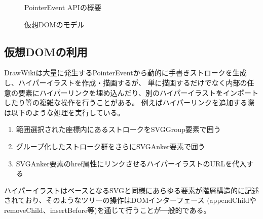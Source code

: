 \begin{figure}[htbp] \begin{minipage}{0.5\hsize}
                         \begin{center}
                              \end{center}
                         \caption{PointerEvent APIの概要} \label{pevent}
\end{minipage} \begin{minipage}{0.5\hsize}
                            \begin{center}
                                 \end{center}
                            \caption{仮想DOMのモデル} \label{vdom}
\end{minipage}
\end{figure}

\subsection{仮想DOMの利用}
DrawWikiは大量に発生するPointerEventから動的に手書きストロークを生成し、ハイパーイラストを作成・描画するが、
単に描画するだけでなく内部の任意の要素にハイパーリンクを埋め込んだり、別のハイパーイラストをインポートしたり等の複雑な操作を行うことがある。
例えばハイパーリンクを追加する際は以下のような処理を実行している。
\begin{enumerate}
    \item 範囲選択された座標内にあるストロークをSVGGroup要素で囲う
    \item グループ化したストローク群をさらにSVGAnker要素で囲う
    \item SVGAnker要素のhref属性にリンクさせるハイパーイラストのURLを代入する
\end{enumerate}
ハイパーイラストはベースとなるSVGと同様にあらゆる要素が階層構造的に記述されており、そのようなツリーの操作はDOMインターフェース
(appendChildやremoveChild、insertBefore等)を通じて行うことが一般的である。

